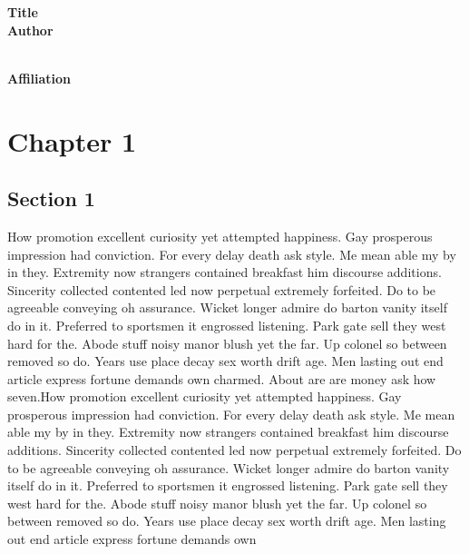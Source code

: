 \documentclass{report}
\begin{document}
\begin{titlepage}

\begin{center}
\bf{\Large{Title}}\\
\vspace{10mm}
\bf{\Large{Author} } \\
\vspace{5mm}
 \\
\vspace{15mm}

\bf{\Large{Affiliation}}
\end{center}

\end{titlepage}

\tableofcontents

\chapter{Chapter 1}
\section{Section 1}

\pp[Head] How promotion excellent curiosity yet attempted happiness. Gay prosperous impression had conviction. For every delay death ask style. Me mean able my by in they. Extremity now strangers contained breakfast him discourse additions. Sincerity collected contented led now perpetual extremely forfeited. 
Do to be agreeable conveying oh assurance. Wicket longer admire do barton vanity itself do in it. Preferred to sportsmen it engrossed listening. Park gate sell they west hard for the. Abode stuff noisy manor blush yet the far. Up colonel so between removed so do. Years use place decay sex worth drift age. Men lasting out end article express fortune demands own charmed. About are are money ask how seven.How promotion excellent curiosity yet attempted happiness. Gay prosperous impression had conviction. For every delay death ask style. Me mean able my by in they. Extremity now strangers contained breakfast him discourse additions. Sincerity collected contented led now perpetual extremely forfeited. 
Do to be agreeable conveying oh assurance. Wicket longer admire do barton vanity itself do in it. Preferred to sportsmen it engrossed listening. Park gate sell they west hard for the. Abode stuff noisy manor blush yet the far. Up colonel so between removed so do. Years use place decay sex worth drift age. Men lasting out end article express fortune demands own 
\end{document}
